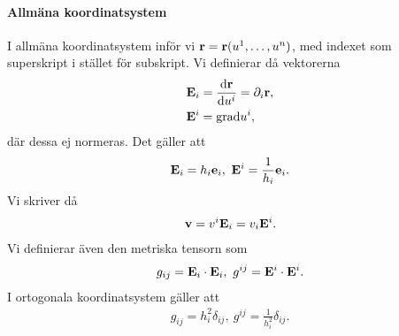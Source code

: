 \paragraph{Allmäna koordinatsystem}
I allmäna koordinatsystem inför vi $\vb{r} = \vb{r}(u^1, \dots, u^n)$, med indexet som superskript i stället för subskript. Vi definierar då vektorerna
\begin{align*}
	\vb{E}_{i} &= \dv{\vb{r}}{u^i} = \partial_{i}\vb{r}, \\
	\vb{E}^{i} &= \text{grad}u^i,
\end{align*}
där dessa ej normeras. Det gäller att
\begin{align*}
	\vb{E}_{i} = h_i\vb{e}_{i},\ \vb{E}^{i} = \frac{1}{h_i}\vb{e}_{i}.
\end{align*}
Vi skriver då
\begin{align*}
	\vb{v} = v^i\vb{E}_i = v_i\vb{E}^i.
\end{align*}
Vi definierar även den metriska tensorn som
\begin{align*}
	g_{ij} = \vb{E}_i\cdot\vb{E}_i,\ g^{ij} = \vb{E}^i\cdot\vb{E}^i.
\end{align*}
I ortogonala koordinatsystem gäller att
\begin{align*}
	g_{ij} = h_i^2\delta_{ij},\ g^{ij} = \frac{1}{h_i^2}\delta_{ij}.
\end{align*}